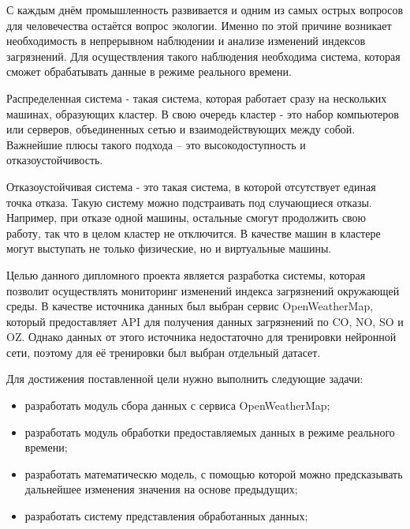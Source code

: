 \label{sec:intro}

С каждым днём промышленность развивается и одним из самых острых вопросов для человечества остаётся вопрос экологии.
Именно по этой причине возникает необходимость в непрерывном наблюдении и анализе изменений индексов загрязнений.
Для осуществления такого наблюдения необходима система, которая сможет обрабатывать данные в режиме реального времени.

Распределенная система - такая система, которая работает сразу на нескольких машинах, образующих кластер.
В свою очередь кластер - это набор компьютеров или серверов, объединенных сетью и взаимодействующих между собой.
Важнейшие плюсы такого подхода – это высокодоступность и отказоустойчивость.

Отказоустойчивая система - это такая система, в которой отсутствует единая точка отказа.
Такую систему можно подстраивать под случающиеся отказы.
Например, при отказе одной машины, остальные смогут продолжить свою работу, так что в целом кластер не отключится.
В качестве машин в кластере могут выступать не только физические, но и виртуальные машины.

Целью данного дипломного проекта является разработка системы, которая позволит осуществлять мониторинг изменений индекса загрязнений окружающей среды.
В качестве источника данных был выбран сервис OpenWeatherMap, который предоставляет API для получения данных загрязнений по CO, NO, SO и OZ.
Однако данных от этого источника недостаточно для тренировки нейронной сети, поэтому для её тренировки был выбран отдельный датасет.


Для достижения поставленной цели нужно выполнить следующие задачи:
\begin{itemize}
    \item разработать модуль сбора данных с сервиса OpenWeatherMap;
    \item разработать модуль обработки предоставляемых данных в режиме реального времени;
    \item разработать математическю модель, с помощью которой можно предсказывать дальнейшее изменения значения на основе предыдущих;
    \item разработать систему представления обработанных данных;
\end{itemize}

